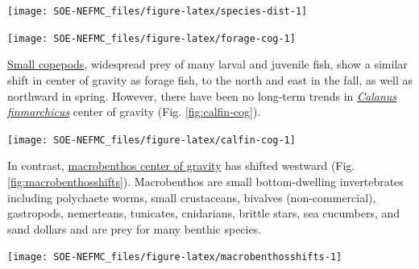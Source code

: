 \documentclass[
  10pt,
]{article}
\let\origfigure\figure
\let\endorigfigure\endfigure
\renewenvironment{figure}[1][2] {
    \expandafter\origfigure\expandafter[H]
} {
    \endorigfigure
}
\begin{document}
\begin{figure}

{\centering \texttt{[image: SOE-NEFMC\_files/figure-latex/species-dist-1]} 

}

\caption{Aggregate species distribution metrics for species in the Northeast Large Marine Ecosystem.}\label{fig:species-dist}
\end{figure}
\begin{figure}

{\centering \texttt{[image: SOE-NEFMC\_files/figure-latex/forage-cog-1]} 

}

\caption{Eastward (left) and northward (right) shifts in the center of gravity for 20 forage fish species on the Northeast U.S. Shelf.}\label{fig:forage-cog}
\end{figure}

\href{https://noaa-edab.github.io/catalog/zooplankton_index.html}{Small copepods}, widespread prey of many larval and juvenile fish, show a similar shift in center of gravity as forage fish, to the north and east in the fall, as well as northward in spring. However, there have been no long-term trends in \href{https://noaa-edab.github.io/catalog/zooplankton_index.html}{\emph{Calanus finmarchicus}} center of gravity (Fig. \ref{fig:calfin-cog}).

\begin{figure}

{\centering \texttt{[image: SOE-NEFMC\_files/figure-latex/calfin-cog-1]} 

}

\caption{Eastward (left) and northward (right) shifts in the center of gravity for *Calanus finmarchicus* on the Northeast U.S. Shelf.}\label{fig:calfin-cog}
\end{figure}

In contrast, \href{https://noaa-edab.github.io/catalog/benthos_index.html}{macrobenthos center of gravity} has shifted westward (Fig. \ref{fig:macrobenthosshifts}). Macrobenthos are small bottom-dwelling invertebrates including polychaete worms, small crustaceans, bivalves (non-commercial), gastropods, nemerteans, tunicates, cnidarians, brittle stars, sea cucumbers, and sand dollars and are prey for many benthic species.

\begin{center}\texttt{[image: SOE-NEFMC\_files/figure-latex/macrobenthosshifts-1]} \end{center}
\end{document}
